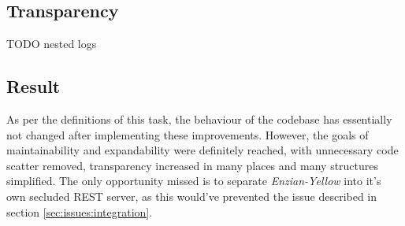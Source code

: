 \subsection{Transparency}
\label{sec:impr:enzian:log}

TODO nested logs

\subsection{Result}
\label{sec:impr:enzian:result}

As per the definitions of this task, the behaviour of the codebase has essentially not changed after implementing these improvements. However, the goals of maintainability and expandability were definitely reached, with unnecessary code scatter removed, transparency increased in many places and many structures simplified. \newline
The only opportunity missed is to separate \emph{Enzian-Yellow} into it's own secluded REST server, as this would've prevented the issue described in section \ref{sec:issues:integration}.